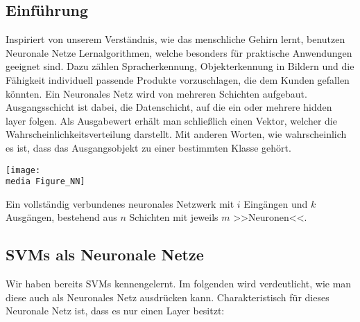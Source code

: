 \subsection{Einführung}

Inspiriert von unserem Verständnis, wie das menschliche Gehirn lernt, benutzen Neuronale Netze Lernalgorithmen, welche besonders für praktische Anwendungen geeignet sind.
Dazu zählen Spracherkennung, Objekterkennung in Bildern und die Fähigkeit individuell passende Produkte vorzuschlagen, die dem Kunden gefallen könnten. 
Ein Neuronales Netz wird von mehreren Schichten aufgebaut. Ausgangsschicht ist dabei, die Datenschicht, auf die ein oder mehrere hidden layer folgen. Als Ausgabewert erhält man schließlich einen Vektor, welcher die Wahrscheinlichkeitsverteilung darstellt. Mit anderen Worten, wie wahrscheinlich es ist, dass das Ausgangsobjekt zu einer bestimmten Klasse gehört.

\begin{dsafigure}
	\begin{center}
		\texttt{[image: \\media Figure\_NN]}
		\caption{Ein vollständig verbundenes neuronales Netzwerk mit $i$ Eingängen und $k$ Ausgängen, bestehend aus $n$ Schichten mit jeweils $m$ >>Neuronen<<.}
		\label{FigNN}
	\end{center}
\end{dsafigure}

\subsection{SVMs als Neuronale Netze}

Wir haben bereits SVMs kennengelernt. Im folgenden wird verdeutlicht, wie man diese auch als Neuronales Netz ausdrücken kann. Charakteristisch für dieses Neuronale Netz ist, dass es nur einen Layer besitzt:

%
%
%

